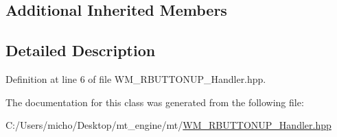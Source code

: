 \subsection*{Additional Inherited Members}


\subsection{Detailed Description}


Definition at line 6 of file W\+M\+\_\+\+R\+B\+U\+T\+T\+O\+N\+U\+P\+\_\+\+Handler.\+hpp.



The documentation for this class was generated from the following file\+:\begin{DoxyCompactItemize}
\item 
C\+:/\+Users/micho/\+Desktop/mt\+\_\+engine/mt/\hyperlink{_w_m___r_b_u_t_t_o_n_u_p___handler_8hpp}{W\+M\+\_\+\+R\+B\+U\+T\+T\+O\+N\+U\+P\+\_\+\+Handler.\+hpp}\end{DoxyCompactItemize}
